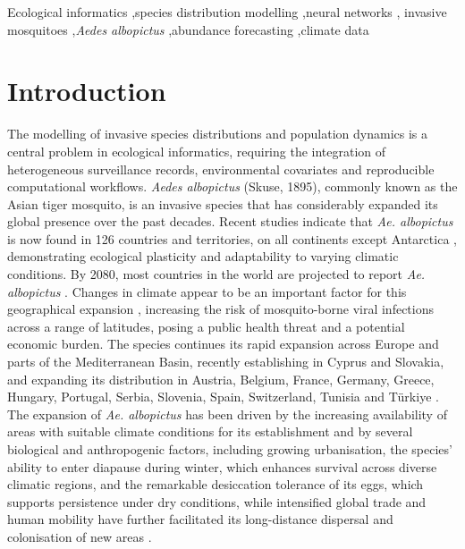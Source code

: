 \documentclass[preprint,12pt]{elsarticle}
\begin{document}
\begin{frontmatter}
\begin{keyword}
Ecological informatics \sep species distribution modelling \sep neural networks \sep
invasive mosquitoes \sep \textit{Aedes albopictus} \sep abundance forecasting \sep climate data
\end{keyword}

\end{frontmatter}

\linenumbers

\section{Introduction}

The modelling of invasive species distributions and population dynamics is a central problem in ecological informatics, requiring the integration of heterogeneous surveillance records, environmental covariates and reproducible computational workflows.
\emph{Aedes albopictus} (Skuse, 1895), commonly known as the Asian tiger mosquito, is an invasive species that has considerably expanded its global presence over the past decades. Recent studies indicate that \emph{Ae. albopictus} is now found in 126 countries and territories, on all continents except Antarctica \cite{Wilkerson2020}, demonstrating ecological plasticity and adaptability to varying climatic conditions. By 2080, most countries in the world are projected to report \emph{Ae. albopictus}  \cite{kraemer2019}. Changes in climate appear to be an important factor for this geographical expansion \cite{ryan2019}, increasing the risk of mosquito-borne viral infections across a range of latitudes, posing a public health threat and a potential economic burden. The species continues its rapid expansion across Europe and parts of the Mediterranean Basin, recently establishing in Cyprus and Slovakia, and expanding its distribution in Austria, Belgium, France, Germany, Greece, Hungary, Portugal, Serbia, Slovenia, Spain, Switzerland, Tunisia and Türkiye \cite{ecdc2024b}.
The expansion of \emph{Ae. albopictus} has been driven by the increasing availability of areas with suitable climate conditions for its establishment and by several biological and anthropogenic factors, including growing urbanisation, the species’ ability to enter diapause during winter, which enhances survival across diverse climatic regions, and the remarkable desiccation tolerance of its eggs, which supports persistence under dry conditions, while intensified global trade and human mobility have further facilitated its long-distance dispersal and colonisation of new areas \cite{hawley1988}.
\end{document}
